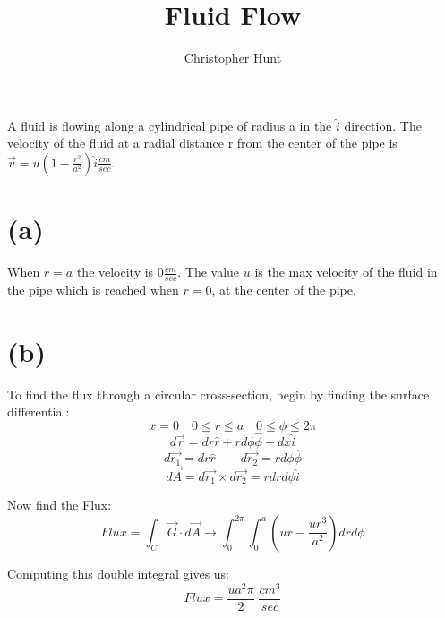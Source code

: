 \documentclass[11pt]{article}
\title{Fluid Flow}
\author{Christopher Hunt}
\date{}
\begin{document}
\pagestyle{fancy}
\fancyhf{}
\rhead{\thepage}
\maketitle

A fluid is flowing along a cylindrical pipe of radius a in the $\hat{i}$ direction. The velocity of the fluid at a radial distance r from the center of the pipe is $\vec{v} = u(1 - \frac{r^2}{a^2})\hat{i} \frac{cm}{sec}$.

\section*{(a)}

When $r = a$ the velocity is $0\frac{cm}{sec}$. The value $u$ is the max velocity of the fluid in the pipe which is reached when $r = 0$, at the center of the pipe.

\section*{(b)}
To find the flux through a circular cross-section, begin by finding the surface differential:
$$x = 0 \quad 0 \leq r \leq a \quad 0 \leq \phi \leq 2\pi$$
$$d\vec{r} = dr \hat{r} + rd\phi\hat{\phi} + dx \hat{i}$$
$$d\vec{r_1} = dr\hat{r} \qquad d\vec{r_2} = rd\phi \hat{\phi} $$
$$d\vec{A} = d\vec{r_1} \times d\vec{r_2} = rdrd\phi\hat{i}$$

Now find the Flux:
$$Flux = \int_C \vec{G} \cdot d\vec{A} \rightarrow \int_0^{2\pi}\int_0^{a} (ur - \frac{ur^3}{a^2})drd\phi$$

Computing this double integral gives us:
$$Flux = \frac{ua^2\pi}{2} \; \frac{cm^3}{sec}$$
\end{document}
